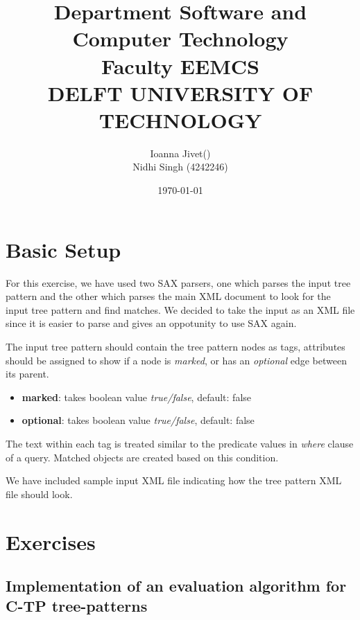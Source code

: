\documentclass[a4paper,10pt]{article}
\begin{document}
\title{\flushleft\small{Department Software and Computer Technology\\ 
Faculty EEMCS\\
DELFT UNIVERSITY OF TECHNOLOGY\\}
}
\author{Ioanna Jivet() \\
Nidhi Singh (4242246)}
        
\date{\today}
    
\maketitle

\section{Basic Setup}

For this exercise, we have used two SAX parsers, one which parses the input tree pattern and the other which parses the main XML document
to look for the input tree pattern and find matches. We decided to take the input as an XML file since it is easier to parse and gives an oppotunity 
to use SAX again.

The input tree pattern should contain the tree pattern nodes as tags, attributes should be assigned to show if a node is \emph{marked}, or has an 
\emph{optional} edge between its parent.
\begin{itemize}
  \item \textbf{marked}: takes boolean value \emph{true/false}, default: false
  \item \textbf{optional}: takes boolean value \emph{true/false}, default: false
\end{itemize}
The text within each tag is treated similar to the predicate values in \emph{where} clause of a query. Matched objects are created based on this condition.

We have included sample input XML file indicating how the tree pattern XML file should look. 
\section{Exercises}
\subsection{Implementation of an evaluation algorithm for C-TP tree-patterns}
\end{document}

